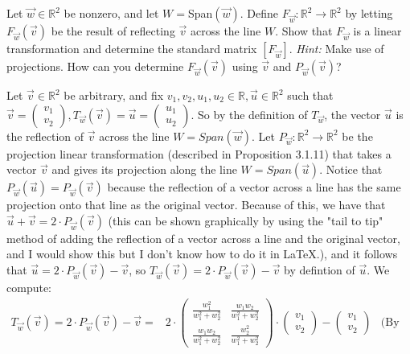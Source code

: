\documentclass[12pt]{article}
\newenvironment{problem}[2][Problem]
{
	\begin{trivlist} 
		\item[\hskip \labelsep {\bfseries #1 #2:}]
	}
{
	\end{trivlist}
	}
\newenvironment{solution}[1][Solution]
{
	\begin{trivlist} 
		\item[\hskip \labelsep {\itshape #1:}]
	}
	{
	\end{trivlist}
}
\begin{document}
\newpage
\begin{problem}{4}
Let $\vec{w} \in \mathbb{R}^2$ be nonzero, and let $W=$Span$(\vec{w})$. Define $F_{\vec{w}}:\mathbb{R}^2 \to \mathbb{R}^2$ by letting $F_{\vec{w}}(\vec{v})$ be the result of reflecting  $\vec{v}$ across the line $W$. Show that $F_{\vec{w}}$ is a linear transformation and determine the standard matrix $[F_{\vec{w}}]$.
\noindent
\newline
\newline
{\it Hint:} Make use of projections. How can you determine $F_{\vec{w}}(\vec{v})$ using $\vec{v}$ and $P_{\vec{w}}(\vec{v})$?

\noindent
\newline
\newline

\begin{solution}
Let $\vec{v} \in \mathbb{R}^2$ be arbitrary, and fix $v_{1},v_{2},u_{1},u_{2} \in \mathbb{R}, \vec{u} \in \mathbb{R}^2$ such that $\vec{v}=\begin{pmatrix}v_{1}\\v_{2}\end{pmatrix}, T_{\vec{w}}(\vec{v})=\vec{u} = \begin{pmatrix}u_{1}\\u_{2}\end{pmatrix}$. So by the definition of $T_{\vec{w}}$, the vector $\vec{u}$ is the reflection of $\vec{v}$ across the line $W=Span(\vec{w})$. Let $P_{\vec{w}}:\mathbb{R}^2 \to \mathbb{R}^2$ be the projection linear transformation (described in Proposition 3.1.11) that takes a vector $\vec{v}$ and gives its projection along the line $W=Span(\vec{u})$. Notice that $P_{\vec{w}}(\vec{u}) = P_{\vec{w}}(\vec{v})$ because the reflection of a vector across a line has the same projection onto that line as the original vector. Because of this, we have that $\vec{u} + \vec{v} = 2\cdot P_{\vec{w}}(\vec{v})$ (this can be shown graphically by using the "tail to tip" method of adding the reflection of a vector across a line and the original vector, and I would show this but I don't know how to do it in {\LaTeX}.), and it follows that $\vec{u} = 2\cdot P_{\vec{w}}(\vec{v})-\vec{v}$, so $T_{\vec{w}}(\vec{v}) =2\cdot P_{\vec{w}}(\vec{v})-\vec{v}$ by defintion of $\vec{u}$. We compute:
\begin{align*}
T_{\vec{w}}(\vec{v})=2\cdot P_{\vec{w}}(\vec{v})-\vec{v} =& 2\cdot \begin{pmatrix} \frac{w_{1}^2}{w_{1}^2 +w_{2}^2} & \frac{w_{1}w_{2}}{w_{1}^2 +w_{2}^2}\\ \frac{w_{1}w_{2}}{w_{1}^2 +w_{2}^2} & \frac{w_{2}^2}{w_{1}^2 +w_{2}^2} \end{pmatrix} \cdot \begin{pmatrix} v_{1}\\ v_{2} \end{pmatrix} - \begin{pmatrix} v_{1}\\ v_{2} \end{pmatrix} & \text{(By Proposition 3.1.11)} \\

\end{align*}
\end{solution}
\end{problem}
\end{document}
